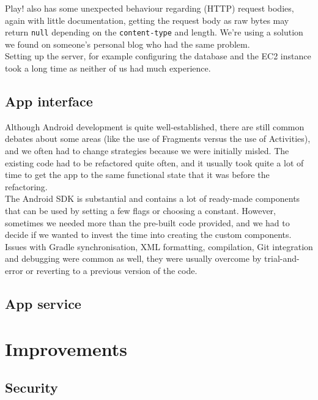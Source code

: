 \documentclass[a4paper,10pt]{article}
\begin{document}
Play! also has some unexpected behaviour regarding (HTTP) request bodies, again with little documentation, getting the
request body as raw bytes may return \texttt{null} depending on the \texttt{content-type} and length.
We're using a solution we found on someone's personal blog who had the same problem.\\

Setting up the server, for example configuring the database and the EC2 instance took a long time
as neither of us had much experience.

\subsection{App interface}
Although Android development is quite well-established, there are still common debates about some areas (like the use of Fragments versus the use of Activities), and we often had to change strategies because we were initially misled. The existing code had to be refactored quite often, and it usually took quite a lot of time to get the app to the same functional state that it was before the refactoring. \\

The Android SDK is substantial and contains a lot of ready-made components that can be used by setting a few flags or choosing a constant. However, sometimes we needed more than the pre-built code provided, and we had to decide if we wanted to invest the time into creating the custom components.\\

Issues with Gradle synchronisation, XML formatting, compilation, Git integration and debugging were common as well, they were usually overcome by trial-and-error or reverting to a previous version of the code.

\subsection{App service}



\section{Improvements}

\subsection{Security}
\end{document}
